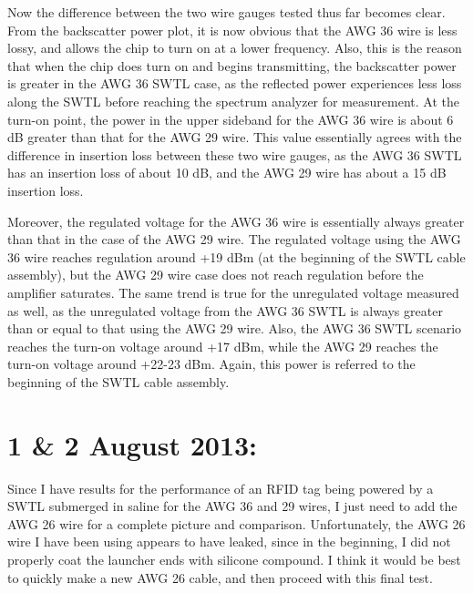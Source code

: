 \documentclass[12pt,onecolumn,titlepage]{article}
\begin{document}
Now the difference between the two wire gauges tested thus far becomes clear. From the backscatter power plot, it is now obvious that the AWG 36 wire is less lossy, and allows the chip to turn on at a lower frequency. Also, this is the reason that when the chip does turn on and begins transmitting, the backscatter power is greater in the AWG 36 SWTL case, as the reflected power experiences less loss along the SWTL before reaching the spectrum analyzer for measurement. At the turn-on point, the power in the upper sideband for the AWG 36 wire is about 6 dB greater than that for the AWG 29 wire. This value essentially agrees with the difference in insertion loss between these two wire gauges, as the AWG 36 SWTL has an insertion loss of about 10 dB, and the AWG 29 wire has about a 15 dB insertion loss. 

Moreover, the regulated voltage for the AWG 36 wire is essentially always greater than that in the case of the AWG 29 wire. The regulated voltage using the AWG 36 wire reaches regulation around +19 dBm (at the beginning of the SWTL cable assembly), but the AWG 29 wire case does not reach regulation before the amplifier saturates. The same trend is true for the unregulated voltage measured as well, as the unregulated voltage from the AWG 36 SWTL is always greater than or equal to that using the AWG 29 wire. Also, the AWG 36 SWTL scenario reaches the turn-on voltage around +17 dBm, while the AWG 29 reaches the turn-on voltage around +22-23 dBm. Again, this power is referred to the beginning of the SWTL cable assembly.






\clearpage
\section{1 \& 2 August 2013:}

\indent \indent Since I have results for the performance of an RFID tag being powered by a SWTL submerged in saline for the AWG 36 and 29 wires, I just need to add the AWG 26 wire for a complete picture and comparison. Unfortunately, the AWG 26 wire I have been using appears to have leaked, since in the beginning, I did not properly coat the launcher ends with silicone compound. I think it would be best to quickly make a new AWG 26 cable, and then proceed with this final test.
\end{document}
